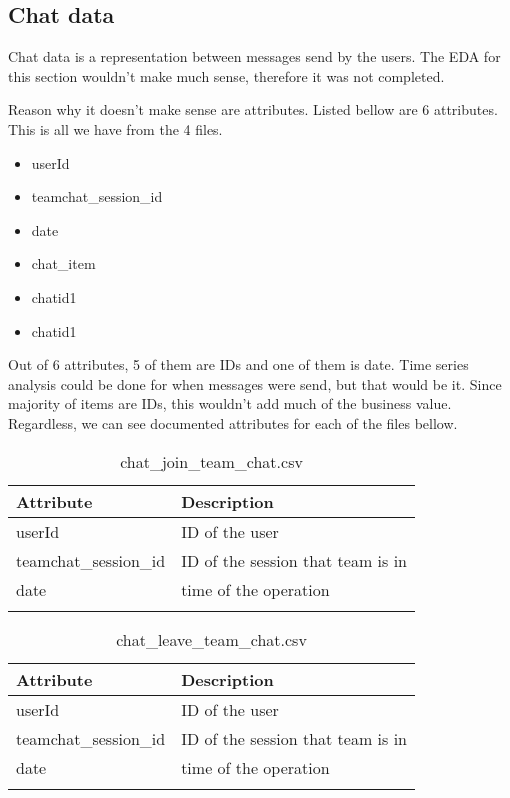 \subsection{Chat data}\label{EDA}

Chat data is a representation between messages send by the users. The EDA for this section wouldn't make much sense, therefore it was not completed. 

Reason why it doesn't make sense are attributes. Listed bellow are 6 attributes. This is all we have from the 4 files. 
\begin{itemize}
    \item userId
    \item teamchat\_session\_id
    \item date
    \item chat\_item
    \item chatid1
    \item chatid1
\end{itemize}

Out of 6 attributes, 5 of them are IDs and one of them is date. Time series analysis could be done for when messages were send, but that would be it. Since majority of items are IDs, this wouldn't add much of the business value. Regardless, we can see documented attributes for each of the files bellow.

\begin{center}
\begin{longtable}{ |l|l| } 
 \hline
 Attribute & Description\\ 
 \hline
 userId & ID of the user\\ 
 \hline
 teamchat\_session\_id & ID of the session that team is in\\ 
 \hline
 date & time of the operation\\ 
 \hline
\caption{chat\_join\_team\_chat.csv}
\end{longtable}
\end{center}

\begin{center}
\begin{longtable}{ |l|l| } 
 \hline
 Attribute & Description\\ 
 \hline
 userId & ID of the user\\ 
 \hline
 teamchat\_session\_id & ID of the session that team is in\\ 
 \hline
 date & time of the operation\\ 
 \hline
\caption{chat\_leave\_team\_chat.csv}
\end{longtable}
\end{center}

